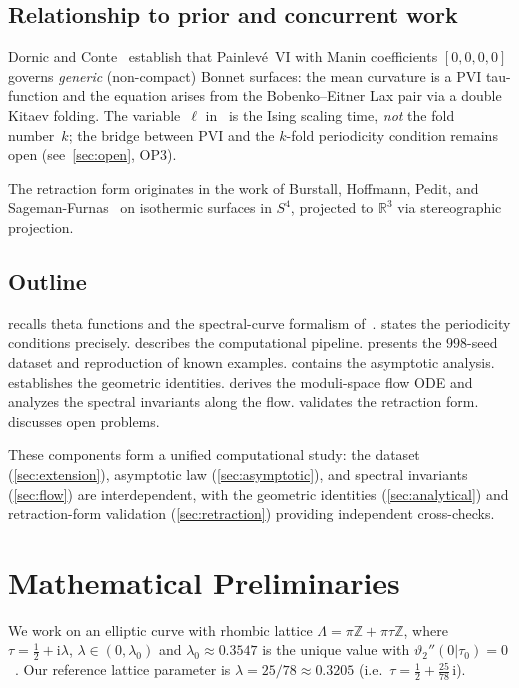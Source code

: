\documentclass[11pt,a4paper]{article}
\theoremstyle{plain}
\theoremstyle{definition}
\theoremstyle{remark}
\newcommand{\vt}[1]{\vartheta_{#1}}     %
\newcommand{\RR}{\mathbb{R}}
\newcommand{\ZZ}{\mathbb{Z}}
\newcommand{\ii}{\mathrm{i}}
\begin{document}
\subsection{Relationship to prior and concurrent work}
Dornic and Conte~\cite{DC26} establish that Painlev\'e~VI
with Manin coefficients $[0,0,0,0]$ governs \emph{generic}
(non-compact) Bonnet surfaces: the mean curvature is a PVI
tau-function and the equation arises from the Bobenko--Eitner
Lax pair via a double Kitaev folding.
The variable~$\ell$ in~\cite{DC26} is the Ising scaling time,
\emph{not} the fold number~$k$; the bridge between PVI and
the $k$-fold periodicity condition remains open
(see~\cref{sec:open}, OP3).

The retraction form originates in the work of Burstall, Hoffmann,
Pedit, and Sageman-Furnas~\cite{BCHR25} on isothermic
surfaces in $S^4$, projected to $\RR^3$ via stereographic projection.

\subsection{Outline}
 recalls theta functions and the spectral-curve
formalism of~\cite{BHS-comp}.   states the
periodicity conditions precisely.   describes
the computational pipeline.   presents the
$998$-seed dataset and reproduction of known examples.
 contains the asymptotic analysis.
 establishes the geometric identities.
 derives the moduli-space flow ODE and analyzes
the spectral invariants along the flow.
 validates the retraction form.
 discusses open problems.

These components form a unified computational study: the dataset
(\cref{sec:extension}), asymptotic law (\cref{sec:asymptotic}), and
spectral invariants (\cref{sec:flow}) are interdependent, with the
geometric identities (\cref{sec:analytical}) and retraction-form
validation (\cref{sec:retraction}) providing independent
cross-checks.

\section{Mathematical Preliminaries}\label{sec:prelim}

We work on an elliptic curve with rhombic lattice
$\Lambda = \pi\ZZ + \pi\tau\ZZ$, where
$\tau = \tfrac12 + \ii\lambda$, $\lambda \in (0,\lambda_0)$ and
$\lambda_0 \approx 0.3547$ is the unique value with
$\vt{2}''(0|\tau_0) = 0$~\cite[Lemma~8]{BHS-comp}.
Our reference lattice parameter is $\lambda = 25/78 \approx 0.3205$
(i.e.\ $\tau = \tfrac{1}{2} + \tfrac{25}{78}\,\ii$).
\end{document}
